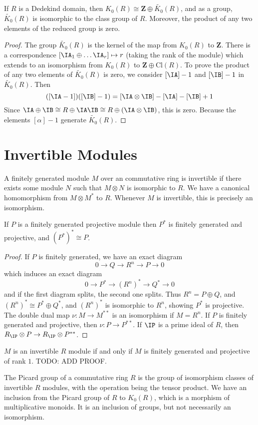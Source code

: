 \begin{corollary}
    If $R$ is a Dedekind domain, then $K_0(R) \cong \mathbf{Z} \oplus \widetilde{K_0}(R)$, and as a group, $\widetilde{K_0}(R)$ is isomorphic to the class group of $R$. Moreover, the product of any two elements of the reduced group is zero.
\end{corollary}
\begin{proof}
    The group $\widetilde{K_0}(R)$ is the kernel of the map from $K_0(R)$ to $\mathbf{Z}$. There is a correspondence $[\IA_1 \oplus \dots \IA_r] \mapsto r$ (taking the rank of the module) which extends to an isomorphism from $K_0(R)$ to $\mathbf{Z} \oplus \text{Cl}(R)$. To prove the product of any two elements of $\tilde{K_0}(R)$ is zero, we consider $[\IA] - 1$ and $[\IB] - 1$ in $\tilde{K_0}(R)$. Then
    \[ ([\IA - 1])([\IB] - 1) = [\IA \otimes \IB] - [\IA] - [\IB] + 1 \]
    Since $\IA \oplus \IB \cong R \oplus \IA \IB \cong R \oplus (\IA \otimes \IB)$, this is zero. Because the elements $[\mathfrak{\alpha}] - 1$ generate $\tilde{K_0}(R)$.
\end{proof}

\section{Invertible Modules}

A finitely generated module $M$ over an commutative ring is invertible if there exists some module $N$ such that $M \otimes N$ is isomorphic to $R$. We have a canonical homomorphism from $M \otimes M^*$ to $R$. Whenever $M$ is invertible, this is precisely an isomorphism.

\begin{lemma}
    If $P$ is a finitely generated projective module then $P^*$ is finitely generated and projective, and $(P^*)^* \cong P$.
\end{lemma}
\begin{proof}
    If $P$ is finitely generated, we have an exact diagram
    \[ 0 \to Q \to R^n \to P \to 0 \]
    which induces an exact diagram
    \[ 0 \to P^* \to (R^n)^* \to Q^* \to 0 \]
    and if the first diagram splits, the second one splits. Thus $R^n = P \oplus Q$, and $(R^n)^* \cong P^* \oplus Q^*$, and $(R^n)^*$ is isomorphic to $R^n$, showing $P^*$ is projective. The double dual map $\nu: M \to M^{**}$ is an isomorphism if $M = R^n$. If $P$ is finitely generated and projective, then $\nu: P \to P^{**}$. If $\IP$ is a prime ideal of $R$, then $R_{\IP} \otimes P \to R_{\IP} \otimes P^{**}$.
\end{proof}

$M$ is an invertible $R$ module if and only if $M$ is finitely generated and projective of rank $1$. TODO: ADD PROOF.

The Picard group of a commutative ring $R$ is the group of isomorphism classes of invertible $R$ modules, with the operation being the tensor product. We have an inclusion from the Picard group of $R$ to $K_0(R)$, which is a morphism of multiplicative monoids. It is an inclusion of groups, but not necessarily an isomorphism.

